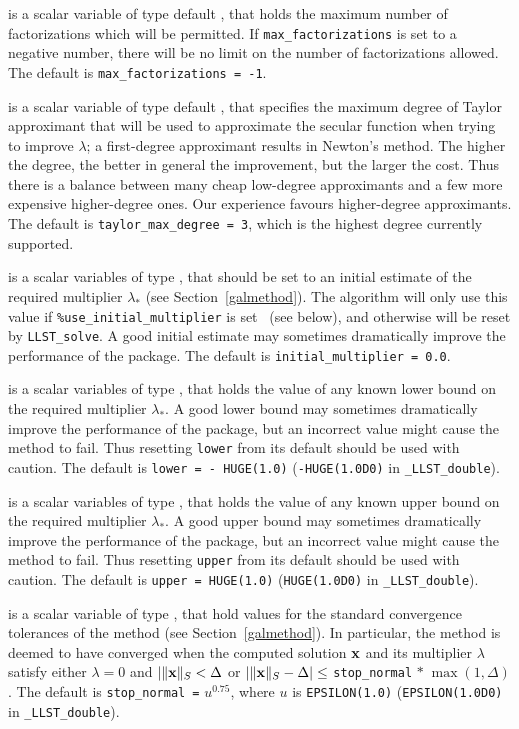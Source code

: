 \documentclass{galahad}
\newcommand{\packagename}{LLST}
\newcommand{\fullpackagename}{\libraryname\_\packagename}
\begin{document}
\begin{description}
 is a scalar variable of type default \integer,
that holds the maximum number of factorizations which will be permitted.
If {\tt max\_factorizations} is set to a negative number, there will be
no limit on the number of factorizations allowed.
The default is {\tt max\_factorizations = -1}.

 is a scalar variable of type default \integer,
that specifies the maximum degree of Taylor approximant that will be used
to approximate the secular function when trying to improve $\lambda$;
a first-degree approximant results in Newton's method.
The higher the degree, the better in general the improvement, but the larger the
cost. Thus there is a balance between many cheap low-degree approximants
and a few more expensive higher-degree ones. Our experience favours
higher-degree approximants.
The default is {\tt taylor\_max\_degree = 3}, which is the highest degree
currently supported.

 is a scalar variables of type \realdp, that should
be set to an initial estimate of the required multiplier $\lambda_*$
(see Section~\ref{galmethod}). The algorithm will only use this value
if {\tt \%use\_initial\_multiplier} is set \true\ (see below), and otherwise
will be reset by {\tt \packagename\_solve}. A good initial estimate
may sometimes dramatically improve the performance of the package.
The default is {\tt initial\_multiplier = 0.0}.

 is a scalar variables of type \realdp, that holds the value
of any known lower bound on the required multiplier $\lambda_*$. A good lower
bound may sometimes dramatically improve the performance of the package, but
an incorrect value might cause the method to fail. Thus resetting
{\tt lower} from its default should be used with caution.
The default is {\tt lower = - HUGE(1.0)}
({\tt -HUGE(1.0D0)} in {\tt \fullpackagename\_double}).

 is a scalar variables of type \realdp, that holds the value
of any known upper bound on the required multiplier $\lambda_*$. A good upper
bound may sometimes dramatically improve the performance of the package, but
an incorrect value might cause the method to fail. Thus resetting
{\tt upper} from its default should be used with caution.
The default is {\tt upper = HUGE(1.0)}
({\tt HUGE(1.0D0)} in {\tt \fullpackagename\_double}).

 is a scalar variable of type \realdp,
that hold values for the standard convergence tolerances of the method
(see Section~\ref{galmethod}).
In particular, the method is deemed to have converged when the
computed solution ${\mathbf{x}}$ and its multiplier $\lambda$ satisfy either
$\lambda = 0$ and $|\|{\mathbf{x}}\|_S < \Delta$ or
$|\|{\mathbf{x}}\|_S -  \Delta| \leq$ {\tt stop\_normal} $\ast \; \max(1,\Delta)$.
The default is {\tt stop\_normal =} $u^{0.75}$,
where $u$ is {\tt EPSILON(1.0)} ({\tt EPSILON(1.0D0)} in
{\tt \fullpackagename\_double}).


\end{description}
\end{document}
